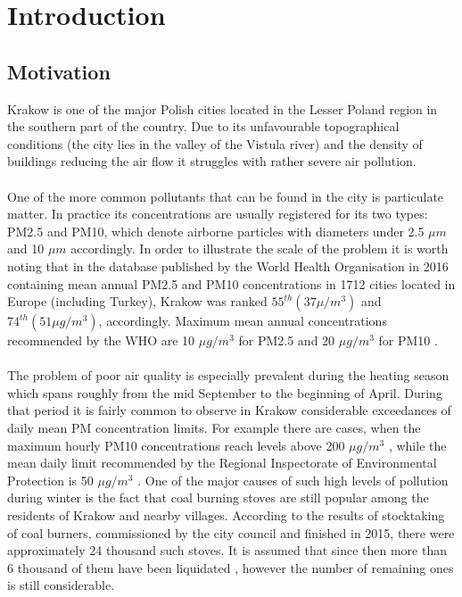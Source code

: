 \chapter{Introduction}\label{chap:introduction}

\section{Motivation}
Krakow is one of the major Polish cities located in the Lesser Poland region in the southern part of the country. Due to its unfavourable topographical conditions (the city lies in the valley of the Vistula river) and the density of buildings reducing the air flow it struggles with rather severe air pollution.
\\\\
One of the more common pollutants that can be found in the city is particulate matter. In practice its concentrations are usually registered for its two types: PM2.5 and PM10, which denote airborne particles with diameters under 2.5 $\mu m$ and 10 $\mu m$ accordingly. In order to illustrate the scale of the problem it is worth noting that in the database published by the World Health Organisation in 2016 \cite{WHO2016AMBIENT} containing mean annual PM2.5 and PM10 concentrations in 1712 cities located in Europe (including Turkey), Krakow was ranked $55^{th} (37 \mu / m^3)$ and $74^{th} (51 \mu g / m^3)$, accordingly. Maximum mean annual concentrations recommended by the WHO are 10 $\mu g / m^3$ for PM2.5 and 20 $\mu g / m^3$ for PM10 \cite{WHO2008AQGUIDELINES}.
\\\\
The problem of poor air quality is especially prevalent during the heating season which spans roughly from the mid September to the beginning of April. During that period it is fairly common to observe in Krakow considerable exceedances of daily mean PM concentration limits. For example there are cases, when the maximum hourly PM10 concentrations reach levels above 200 $\mu g / m^3$ \cite{WIOSALERTS}, while the mean daily limit recommended by the Regional Inspectorate of Environmental Protection is 50 $\mu g / m^3$ \cite{WIOSNORMS}. One of the major causes of such high levels of pollution during winter is the fact that coal burning stoves are still popular among the residents of Krakow and nearby villages. According to the results of stocktaking of coal burners, commissioned by the city council and finished in 2015, there were approximately 24 thousand such stoves. It is assumed that since then more than 6 thousand of them have been liquidated \cite{COALBURNERS}, however the number of remaining ones is still considerable.
